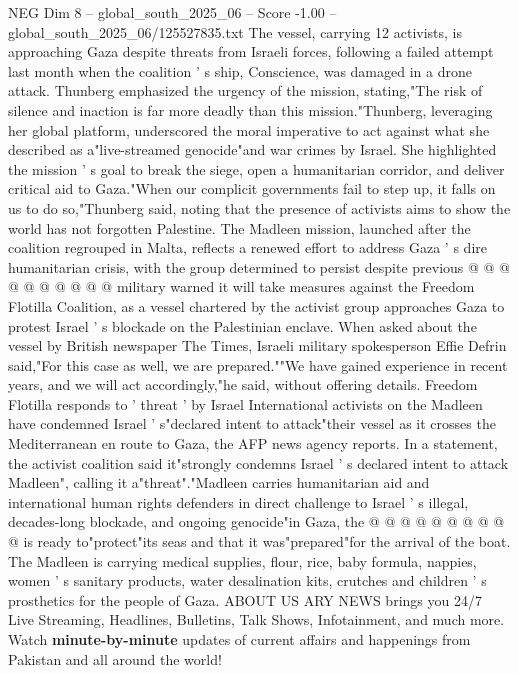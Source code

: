 \begin{textsample}{NEG Dim 8 – global\_south\_2025\_06 – Score -1.00 – global\_south\_2025\_06/125527835.txt}  \label{ex:f8_neg_253}
The vessel, carrying 12 activists, is approaching Gaza despite threats from Israeli forces, following a failed attempt last month when the coalition ' s ship, Conscience, was damaged in a drone attack.
Thunberg emphasized the urgency of the mission, stating,"The risk of silence and inaction is far more deadly than this mission."Thunberg, leveraging her global platform, underscored the moral imperative to act against what she described as a"live-streamed genocide"and war crimes by Israel.
She highlighted the mission ' s goal to break the siege, open a humanitarian corridor, and deliver critical aid to Gaza."When our complicit governments fail to step up, it falls on us to do so,"Thunberg said, noting that the presence of activists aims to show the world has not forgotten Palestine.
The Madleen mission, launched after the coalition regrouped in Malta, reflects a renewed effort to address Gaza ' s dire humanitarian crisis, with the group determined to persist despite previous @ @ @ @ @ @ @ @ @ @ military warned it will take measures against the Freedom Flotilla Coalition, as a vessel chartered by the activist group approaches Gaza to protest Israel ' s blockade on the Palestinian enclave.
When asked about the vessel by British newspaper The Times, Israeli military spokesperson Effie Defrin said,"For this case as well, we are prepared.""We have gained experience in recent years, and we will act accordingly,"he said, without offering details.
Freedom Flotilla responds to ' threat ' by Israel International activists on the Madleen have condemned Israel ' s"declared intent to attack"their vessel as it crosses the Mediterranean en route to Gaza, the AFP news agency reports.
In a statement, the activist coalition said it"strongly condemns Israel ' s declared intent to attack Madleen", calling it a"threat"."Madleen carries humanitarian aid and international human rights defenders in direct challenge to Israel ' s illegal, decades-long blockade, and ongoing genocide"in Gaza, the @ @ @ @ @ @ @ @ @ @ is ready to"protect"its seas and that it was"prepared"for the arrival of the boat.
The Madleen is carrying medical supplies, flour, rice, baby formula, nappies, women ' s sanitary products, water desalination kits, crutches and children ' s prosthetics for the people of Gaza.
ABOUT US ARY NEWS brings you 24/7 Live Streaming, Headlines, Bulletins, Talk Shows, Infotainment, and much more.
Watch \textbf{minute-by-minute} updates of current affairs and happenings from Pakistan and all around the world!

\end{textsample}
